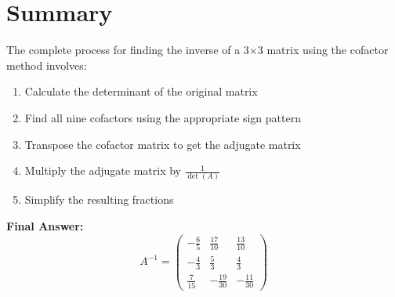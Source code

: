 \documentclass[12pt]{article}
\begin{document}
\section{Summary}

The complete process for finding the inverse of a 3×3 matrix using the cofactor method involves:

\begin{enumerate}
\item Calculate the determinant of the original matrix
\item Find all nine cofactors using the appropriate sign pattern
\item Transpose the cofactor matrix to get the adjugate matrix
\item Multiply the adjugate matrix by $\frac{1}{\det(A)}$
\item Simplify the resulting fractions
\end{enumerate}

\textbf{Final Answer:}
\[
A^{-1} = \begin{pmatrix}
-\frac{6}{5} & \frac{17}{10} & \frac{13}{10} \\
-\frac{4}{3} & \frac{5}{3} & \frac{4}{3} \\
\frac{7}{15} & -\frac{19}{30} & -\frac{11}{30}
\end{pmatrix}
\]
\end{document}
